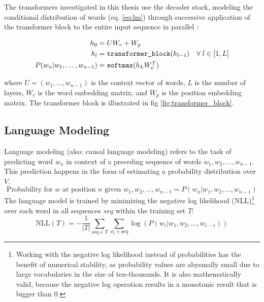 The transformers investigated in this thesis use the decoder stack, modeling the conditional distribution of words (eq. \ref{eq:lm}) through successive application of the transformer block to the entire input sequence in parallel  \parencite{radford_improving_2018}:

\begin{equation}\label{eq:transformer}
    \begin{split}
        h_0 &= UW_e + W_p \\
        h_l &= \text{\texttt{transformer\_block}}(h_{l - 1})\quad\forall\; l \in [1,L]\\
        P(w_n | w_1 , \dots , w_{n-1}) &= \texttt{softmax}(h_LW_e^T)
    \end{split}
\end{equation}

where $U = (w_1 , \dots , w_{n-1} )$ is the context vector of words, $L$ is the number of layers, $W_e$ is the word embedding matrix, and $W_p$ is the position embedding matrix.
The transformer block is illustrated in fig \ref{fig:transformer_block}.


\subsection{Language Modeling}
Language modeling (also: causal language modeling) refers to the task of predicting word $w_n$ in context of a preceding sequence of words $w_1, w_2, \dots, w_{n-1}$.
This prediction happens in the form of estimating a probability distribution over $V$.
\begin{equation}
    \text{Probability for $w$ at position $n$ given $w_1, w_2, \dots, w_{n-1}$} = P(w_n | w_1, w_2, \dots, w_{n-1})
\end{equation}
The language model is trained by minimizing the negative log likelihood (NLL)\footnote{Working with the negative log likelihood instead of probabilities has the benefit of numerical stability, as probability values are abysmally small due to large vocabularies in the size of ten-thousands. It is also mathematically valid, because the negative log operation results in a monotonic result that is bigger than 0.} over each word in all sequences $seq$ within the training set $T$:
\begin{equation}
    \text{NLL}(T) = - \frac{1}{|T|} \sum_{\text{seq} \in T} \sum_{w_i \in \text{seq}} \log\left(P(w_i | w_1, w_2, \dots, w_{i-1})\right)
\end{equation}


